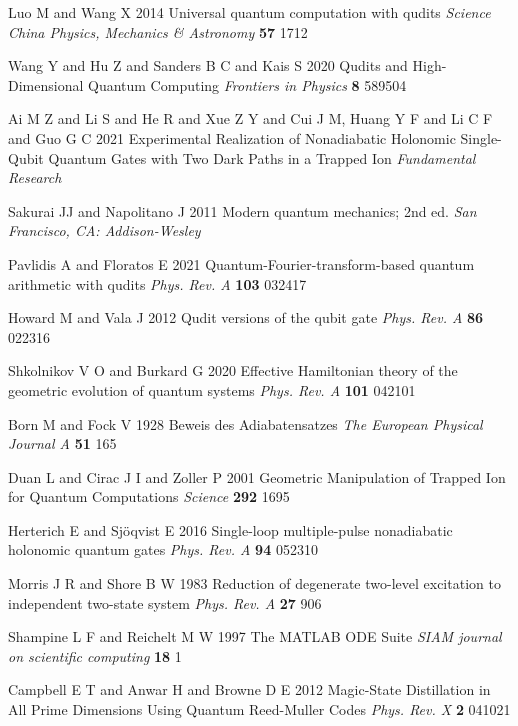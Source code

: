 \begin{enumerate}[label={[\arabic*]}]
\item Luo M and Wang X 2014 Universal quantum computation with qudits \textit{Science China Physics, Mechanics \& Astronomy} \textbf{57} 1712


\item Wang Y and Hu Z and Sanders B C and Kais S 2020 Qudits and High-Dimensional Quantum Computing \textit{Frontiers in Physics} \textbf{8} 589504

\item Ai M Z and Li S and He R and Xue Z Y and Cui J M, Huang Y F and Li C F and Guo G C 2021 Experimental Realization of
Nonadiabatic Holonomic Single-Qubit Quantum Gates with Two Dark Paths in
a Trapped Ion \textit{Fundamental Research}

\item Sakurai JJ and Napolitano J 2011 Modern quantum mechanics; 2nd ed. \textit{San Francisco, CA: Addison-Wesley}

\item Pavlidis A and Floratos E 2021 Quantum-Fourier-transform-based quantum arithmetic with qudits \textit{Phys. Rev. A}  \textbf{103} 032417

\item Howard M and Vala J 2012 Qudit versions of the qubit gate \textit{Phys. Rev. A} \textbf{86} 022316

\item Shkolnikov V O and Burkard G 2020 Effective Hamiltonian theory of the geometric evolution of quantum systems \textit{Phys. Rev. A} \textbf{101} 042101

\item Born M and Fock V 1928 Beweis des Adiabatensatzes \textit{The European Physical Journal A} \textbf{51} 165

\item Duan L and Cirac J I and Zoller P 2001 Geometric Manipulation of Trapped Ion for Quantum Computations \textit{Science} \textbf{292} 1695

\item Herterich E and Sjöqvist E 2016 Single-loop multiple-pulse nonadiabatic holonomic quantum gates \textit{Phys. Rev. A} \textbf{94} 052310

\item Morris J R and Shore B W 1983 Reduction of degenerate two-level excitation to independent two-state system \textit{Phys. Rev. A} \textbf{27} 906

\item Shampine L F and Reichelt M W 1997 The MATLAB ODE Suite \textit{SIAM journal on scientific computing} \textbf{18} 1

\item Campbell E T and Anwar H and Browne D E 2012 Magic-State Distillation in All Prime Dimensions Using Quantum Reed-Muller Codes \textit{Phys. Rev. X} \textbf{2} 041021




\end{enumerate}